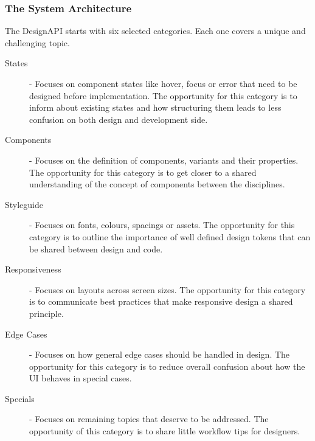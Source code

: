 \subsubsection{The System Architecture}
% 

%


The DesignAPI starts with six selected categories. Each one covers a unique and challenging topic.

\begin{description}
      \item[States] - Focuses on component states like hover, focus or error that need to be
            designed before implementation. The opportunity for this category is to inform about
            existing states and how structuring them leads to less confusion on both design and
            development side.

      \item[Components] - Focuses on the definition of components, variants and their properties.
            The opportunity for this category is to get closer to a shared understanding of the
            concept of components between the disciplines.

      \item[Styleguide] - Focuses on fonts, colours, spacings or assets. The opportunity for this
            category is to outline the importance of well defined design tokens that can be shared
            between design and code.

      \item[Responsiveness] - Focuses on layouts across screen sizes. The opportunity for this
            category is to communicate best practices that make responsive design a shared
            principle.

      \item[Edge Cases] - Focuses on how general edge cases should be handled in design. The
            opportunity for this category is to reduce overall confusion about how the UI behaves in
            special cases.

      \item[Specials] - Focuses on remaining topics that deserve to be addressed. The opportunity of
            this category is to share little workflow tips for designers.
\end{description}

